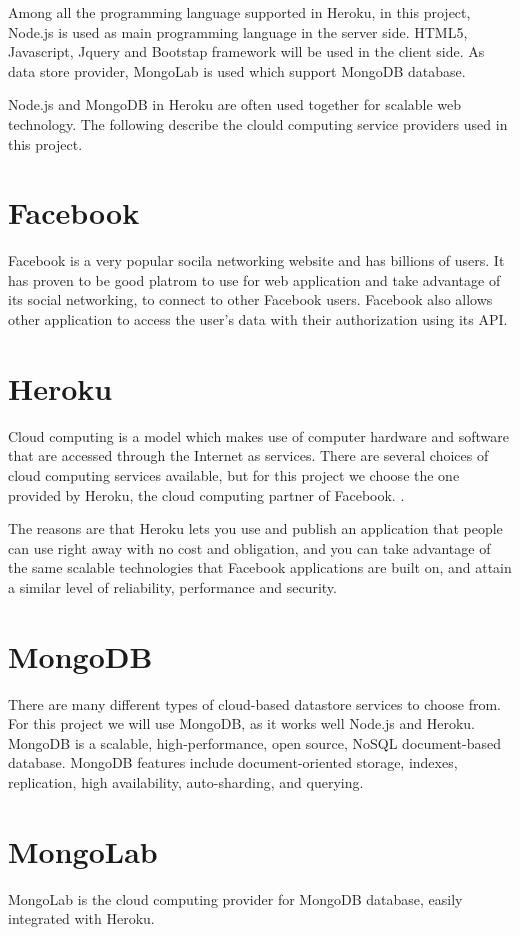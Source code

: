 Among all the programming language supported in Heroku, in this project, Node.js is used as main programming language in the server side. HTML5, Javascript, Jquery and Bootstap framework will be used in the client side. As data store provider, MongoLab is used which support MongoDB database. 

Node.js and MongoDB in Heroku are often used together for scalable web technology. The following describe the clould computing service providers used in this project.

\section{Facebook}
Facebook is a very popular socila networking website and has billions of users. It has proven to be good platrom to use for web application and take advantage of its social networking, to connect to other Facebook users. Facebook also allows other application to access the user's data with their authorization using its API. \cite{Facebook}

\section{Heroku}
Cloud computing is a model which makes use of computer hardware and software that are accessed through the Internet as services. There are several choices of cloud computing services available, but for this project we choose the one provided by Heroku, the cloud computing partner of Facebook. \cite{Heroku}.

The reasons are that Heroku lets you use and publish an application that people can use right away with no cost and obligation, and you can take advantage of the same scalable technologies that Facebook applications are built on, and attain a similar level of reliability, performance and security. 

\section{MongoDB}
There are many different types of cloud-based datastore services to choose from. For this project we will use MongoDB, as it works well Node.js and Heroku. MongoDB is a scalable, high-performance, open source, NoSQL document-based database. MongoDB features include document-oriented storage, indexes, replication, high availability, auto-sharding, and querying. \cite{mongodb}

\section{MongoLab}
MongoLab is the cloud computing provider for MongoDB database, easily integrated with Heroku. \cite{mongolab}

